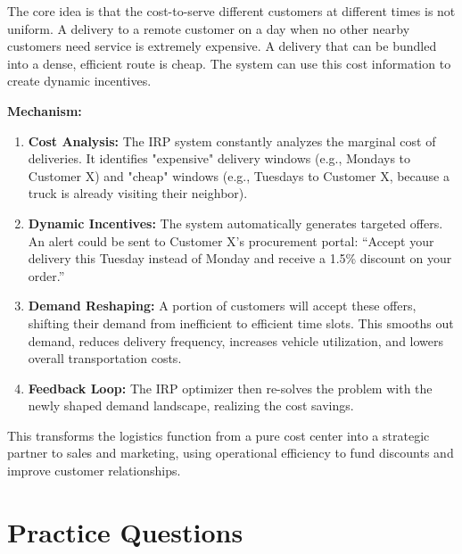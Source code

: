 \documentclass{article}
\begin{document}
The core idea is that the cost-to-serve different customers at different times is not uniform. A delivery to a remote customer on a day when no other nearby customers need service is extremely expensive. A delivery that can be bundled into a dense, efficient route is cheap. The system can use this cost information to create dynamic incentives.

\textbf{Mechanism:}
\begin{enumerate}
    \item \textbf{Cost Analysis:} The IRP system constantly analyzes the marginal cost of deliveries. It identifies "expensive" delivery windows (e.g., Mondays to Customer X) and "cheap" windows (e.g., Tuesdays to Customer X, because a truck is already visiting their neighbor).
    \item \textbf{Dynamic Incentives:} The system automatically generates targeted offers. An alert could be sent to Customer X's procurement portal: ``Accept your delivery this Tuesday instead of Monday and receive a 1.5\% discount on your order.''
    \item \textbf{Demand Reshaping:} A portion of customers will accept these offers, shifting their demand from inefficient to efficient time slots. This smooths out demand, reduces delivery frequency, increases vehicle utilization, and lowers overall transportation costs.
    \item \textbf{Feedback Loop:} The IRP optimizer then re-solves the problem with the newly shaped demand landscape, realizing the cost savings.
\end{enumerate}
This transforms the logistics function from a pure cost center into a strategic partner to sales and marketing, using operational efficiency to fund discounts and improve customer relationships.


\newpage
\section{Practice Questions}
\end{document}
